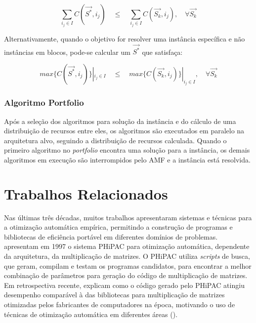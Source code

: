 \documentclass[a4paper, 11pt]{article}
\begin{document}
\begin{equation*}
\sum_{i_j \in I} C(\overrightarrow{S^*},i_j) \quad \leq \quad \sum_{i_j \in I} 
C(\overrightarrow{S_k}, i_j), \quad \forall \overrightarrow{S_k}
\end{equation*}

Alternativamente, quando o objetivo for resolver uma instância específica e 
não instâncias em blocos, pode-se calcular um $\overrightarrow{S^*}$ que
satisfaça:

\begin{equation*}
    max \{C(\overrightarrow{S^*},i_j)\} |_{i_j \in I} \quad \leq \quad
    max \{C(\overrightarrow{S_k}, i_j)\} |_{i_j \in I}, \quad \forall 
    \overrightarrow{S_k}
\end{equation*}

\subsubsection{Algoritmo Portfolio} \label{sec:portfolio}

Após a seleção dos algoritmos para solução da instância e do
cálculo de uma distribuição de recursos entre eles, os algoritmos
são executados em paralelo na arquitetura alvo, seguindo a distribuição
de recursos calculada. Quando o primeiro algoritmo no \emph{portfolio}
encontra uma solução para a instância, os demais algoritmos em execução 
são interrompidos pelo AMF e a instância está resolvida.

\section{Trabalhos Relacionados} \label{sec:trabrel}

Nas últimas três décadas, muitos trabalhos apresentaram sistemas e técnicas 
para a otimização automática empírica, permitindo a construção de programas e 
bibliotecas de eficiência portável em diferentes domínios de problemas.
\citet{bilmes1997} apresentam em 1997 o sistema PHiPAC para otimização
automática, dependente da arquitetura, da multiplicação de matrizes. O PHiPAC
utiliza \emph{scripts} de busca, que geram, compilam e testam os programas
candidatos, para encontrar a melhor combinação de parâmetros para geração do 
código de multiplicação de matrizes. Em retrospectiva recente, 
\citet{bilmes2014phipacretro} explicam como o código gerado pelo PHiPAC atingiu
desempenho comparável à das bibliotecas para multiplicação de matrizes 
otimizadas pelos fabricantes de computadores na época, motivando o uso de
técnicas de otimização automática em diferentes áreas 
(\citet{demmel2009accelerating}).
\end{document}
